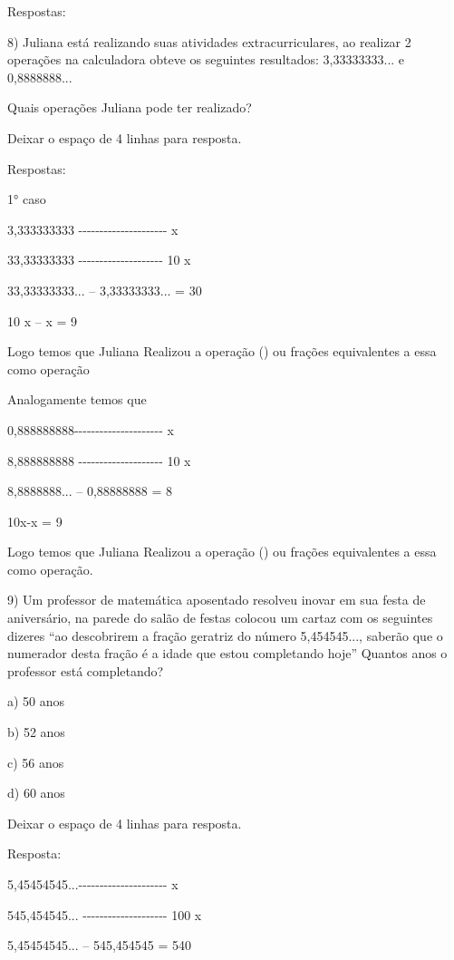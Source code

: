 Respostas:

8) Juliana está realizando suas atividades extracurriculares, ao
realizar 2 operações na calculadora obteve os seguintes resultados:
3,33333333... e 0,8888888...

Quais operações Juliana pode ter realizado?

Deixar o espaço de 4 linhas para resposta.

Respostas:

1° caso

3,333333333
-\/-\/-\/-\/-\/-\/-\/-\/-\/-\/-\/-\/-\/-\/-\/-\/-\/-\/-\/-\/- x

33,33333333 -\/-\/-\/-\/-\/-\/-\/-\/-\/-\/-\/-\/-\/-\/-\/-\/-\/-\/-\/-
10 x

33,33333333... -- 3,33333333... = 30

10 x -- x = 9

Logo temos que Juliana Realizou a operação () ou frações
equivalentes a essa como operação

Analogamente temos que

0,888888888-\/-\/-\/-\/-\/-\/-\/-\/-\/-\/-\/-\/-\/-\/-\/-\/-\/-\/-\/-\/-
x

8,888888888 -\/-\/-\/-\/-\/-\/-\/-\/-\/-\/-\/-\/-\/-\/-\/-\/-\/-\/-\/-
10 x

8,8888888... -- 0,88888888 = 8

10x-x = 9

Logo temos que Juliana Realizou a operação () ou frações
equivalentes a essa como operação.

9) Um professor de matemática aposentado resolveu inovar em sua festa de
aniversário, na parede do salão de festas colocou um cartaz com os
seguintes dizeres ``ao descobrirem a fração geratriz do número
5,454545..., saberão que o numerador desta fração é a idade que estou
completando hoje'' Quantos anos o professor está completando?

a) 50 anos

b) 52 anos

c) 56 anos

d) 60 anos

Deixar o espaço de 4 linhas para resposta.

Resposta:

5,45454545...-\/-\/-\/-\/-\/-\/-\/-\/-\/-\/-\/-\/-\/-\/-\/-\/-\/-\/-\/-\/-
x

545,454545... -\/-\/-\/-\/-\/-\/-\/-\/-\/-\/-\/-\/-\/-\/-\/-\/-\/-\/-\/-
100 x

5,45454545... -- 545,454545 = 540

